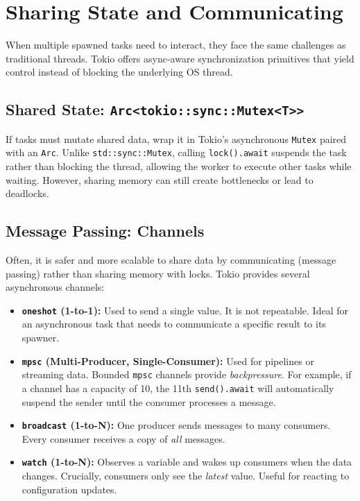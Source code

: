 \section{Sharing State and Communicating}

When multiple spawned tasks need to interact, they face the same challenges as traditional threads. Tokio offers async-aware synchronization primitives that yield control instead of blocking the underlying OS thread.

\subsection{Shared State: \texttt{Arc<tokio::sync::Mutex<T>>}}
If tasks must mutate shared data, wrap it in Tokio's asynchronous \texttt{Mutex} paired with an \texttt{Arc}. Unlike \texttt{std::sync::Mutex}, calling \texttt{lock().await} suspends the task rather than blocking the thread, allowing the worker to execute other tasks while waiting. However, sharing memory can still create bottlenecks or lead to deadlocks.

\subsection{Message Passing: Channels}
Often, it is safer and more scalable to share data by communicating (message passing) rather than sharing memory with locks. Tokio provides several asynchronous channels:
\begin{itemize}
    \item \textbf{\texttt{oneshot} (1-to-1):} Used to send a single value. It is not repeatable. Ideal for an asynchronous task that needs to communicate a specific result to its spawner.
    \item \textbf{\texttt{mpsc} (Multi-Producer, Single-Consumer):} Used for pipelines or streaming data. Bounded \texttt{mpsc} channels provide \textit{backpressure}. For example, if a channel has a capacity of 10, the 11th \texttt{send().await} will automatically suspend the sender until the consumer processes a message.
    \item \textbf{\texttt{broadcast} (1-to-N):} One producer sends messages to many consumers. Every consumer receives a copy of \textit{all} messages.
    \item \textbf{\texttt{watch} (1-to-N):} Observes a variable and wakes up consumers when the data changes. Crucially, consumers only see the \textit{latest} value. Useful for reacting to configuration updates.
\end{itemize}

